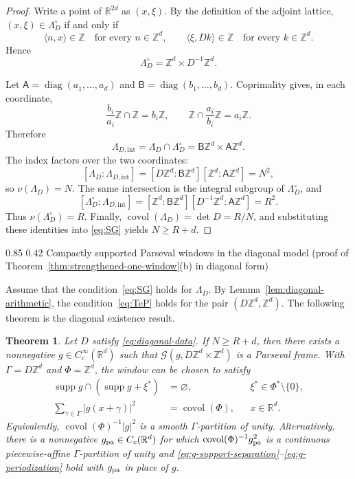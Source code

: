 \documentclass[11pt,reqno]{amsart}
\makeatletter
\numberwithin{equation}{section}
\renewcommand\subsection{\@startsection{subsection}{2}{\z@}%
  {0.85\baselineskip \@plus 0.25\baselineskip \@minus 0.10\baselineskip}%
  {0.42\baselineskip}%
  {\normalfont\bfseries}}
\newtheorem{theorem}{Theorem}[section]
\theoremstyle{definition}
\theoremstyle{remark}
\newcommand{\R}{\mathbb R}
\newcommand{\Z}{\mathbb Z}
\newcommand{\covol}{\operatorname{covol}}
\newcommand{\supp}{\operatorname{supp}}
\newcommand{\G}{\mathcal G}
\newcommand{\ip}[2]{\langle #1,#2\rangle}
\makeatother
\begin{document}
\begin{proof}
Write a point of $\R^{2d}$ as $(x,\xi)$.  By the definition of the adjoint
lattice, $(x,\xi)\in\Lambda_D^\circ$ if and only if
\[
 \ip{n}{x}\in\Z\quad\text{for every }n\in\Z^d,
 \qquad
 \ip{\xi}{Dk}\in\Z\quad\text{for every }k\in\Z^d.
\]
Hence
\begin{equation}\label{eq:diagonal-adjoint-explicit}
 \Lambda_D^\circ=\Z^d\times D^{-1}\Z^d.
\end{equation}

Let $\mathsf A=\operatorname{diag}(a_1,\ldots,a_d)$ and
$\mathsf B=\operatorname{diag}(b_1,\ldots,b_d)$.  Coprimality gives, in
each coordinate,
\[
 \frac{b_i}{a_i}\Z\cap\Z=b_i\Z,
 \qquad
 \Z\cap\frac{a_i}{b_i}\Z=a_i\Z.
\]
Therefore
\begin{equation}\label{eq:diagonal-integral-subgroup-explicit}
 \Lambda_{D,\mathrm{int}}
 =\Lambda_D\cap\Lambda_D^\circ
 =\mathsf B\Z^d\times\mathsf A\Z^d.
\end{equation}
The index factors over the two coordinates:
\[
 [\Lambda_D:\Lambda_{D,\mathrm{int}}]
 =[D\Z^d:\mathsf B\Z^d]
  [\Z^d:\mathsf A\Z^d]
 =N^2,
\]
so $\nu(\Lambda_D)=N$.  The same intersection is the integral subgroup of
$\Lambda_D^\circ$, and
\[
 [\Lambda_D^\circ:\Lambda_{D,\mathrm{int}}]
 =[\Z^d:\mathsf B\Z^d]
  [D^{-1}\Z^d:\mathsf A\Z^d]
 =R^2.
\]
Thus $\nu(\Lambda_D^\circ)=R$.  Finally,
$\covol(\Lambda_D)=\det D=R/N$, and substituting these identities into
\eqref{eq:SG} yields $N\ge R+d$.
\end{proof}

\subsection{Compactly supported Parseval windows in the diagonal model (proof of Theorem~\ref{thm:strengthened-one-window}\textup{(b)} in diagonal form)}
\label{sec:gabor-sufficiency}

Assume that the condition~\eqref{eq:SG} holds for $\Lambda_D$.  By
Lemma~\ref{lem:diagonal-arithmetic}, the condition~\eqref{eq:TeP} holds
for the pair $(D\Z^d,\Z^d)$.  The following theorem is the diagonal existence result.

\begin{theorem}
\label{thm:diagonal-positive}
Let $D$ satisfy \eqref{eq:diagonal-data}.  If $N\ge R+d$, then there exists
a nonnegative $g\in C_c^\infty(\R^d)$ such that
$\G(g,D\Z^d\times\Z^d)$ is a Parseval frame.  With
$\Gamma=D\Z^d$ and $\Phi=\Z^d$, the window can be chosen to satisfy
\begin{align}
 \supp g\cap(\supp g+\xi^*)&=\varnothing,
 &&\xi^*\in\Phi^*\setminus\{0\},
 \label{eq:g-support-separation}\\
 \sum_{\gamma\in\Gamma}|g(x+\gamma)|^2&=\covol(\Phi),
 &&x\in\R^d.
 \label{eq:g-periodization}
\end{align}
Equivalently, $\covol(\Phi)^{-1}|g|^2$ is a smooth
$\Gamma$-partition of unity.
Alternatively, there is a nonnegative $g_{\rm pa}\in C_c(\R^d)$ for which
$\covol(\Phi)^{-1}g_{\rm pa}^2$ is a continuous piecewise-affine
$\Gamma$-partition of unity and
\eqref{eq:g-support-separation}--\eqref{eq:g-periodization} hold with
$g_{\rm pa}$ in place of $g$.
\end{theorem}
\end{document}
